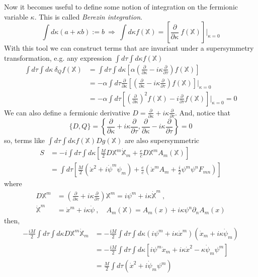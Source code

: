 \documentclass[a4paper,12pt]{article}
\numberwithin{equation}{section}
\numberwithin{exe}{section}
\newcommand{\X}{{\mathbb X}}
\newcommand{\p}{{\partial}}
\newcommand{\xd}{{\dot x}}
\renewcommand{\a}{{\alpha}}
\renewcommand{\d}{{\delta}}
\renewcommand{\k}{{\kappa}}
\begin{document}
Now it becomes useful to define some notion of integration on the fermionic variable $\k$. This is called {\it Berezin integration}.
	\begin{equation}
	\int d\k (a+\k b) := b\ \Rightarrow\ \int d\k f(\X) = \left[\frac{\p}{\p\k}\ f(\X)\right]|_{\k=0}
	\end{equation}
With this tool we can construct terms that are invariant under a supersymmetry transformation, e.g. any expression $\int d\tau \int d\k f(\X)$
	\begin{align}
	\int d\tau \int d\k\ \d_Q f(\X) & = \int d\tau \int d\k \left[\a\left(\frac{\p}{\p\k} - i\k\frac{\p}{\p\tau}\right)f(\X)\right] \nonumber \\
	& = -\a\int d\tau \frac{\p}{\p\k}\left[\left(\frac{\p}{\p\k} - i\k\frac{\p}{\p\tau}\right) f(\X)\right]|_{\k=0} \nonumber \\
	& = -\a\int d\tau \left[ \left(\frac{\p}{\p\k}\right)^2 f(\X) - i\frac{\p}{\p\tau}f(\X) \right]|_{\k=0} = 0
	\end{align}
We can also define a fermionic derivative $D=\frac{\p}{\p\k}+i\k\frac{\p}{\p\tau}$. And, notice that
	\begin{equation}
	\{D,Q\} = \left\{\frac{\p}{\p\k} + i\k\frac{\p}{\p\tau} ,\frac{\p}{\p\k} - i\k\frac{\p}{\p\tau} \right\} = 0
	\end{equation}
so, terms like $\int d\tau \int d\k f(\X) D g(\X)$ are also supersymmetric
	\begin{align}
	S & = -i\int d\tau \int d\k \left[ \frac{M}{2} D\X^m \dot\X_m + \frac{e}{c} D\X^m A_m(\X) \right] \nonumber \\
	& = \int d\tau \left[ \frac{M}{2} (\xd^2 + i\dot\psi^m \psi_m ) + \frac{e}{c} (\xd^m A_m + \frac{i}{2} \psi^m \psi^n F_{mn})   \right]
	\end{align}
where
	\begin{equation}
		\begin{aligned}
		D \X^m & = \left(\frac{\p}{\p\k} + i\k\frac{\p}{\p\tau}\right)\X^m = i\psi^m + i\k\dot\X^m\ , \\
		\dot\X^m & = \xd^m + i\k\dot\psi\ ,\quad A_m(\X) = A_m(x) + i\k\psi^n\p_n A_m(x)
		\end{aligned}
	\end{equation}
then,
	\begin{align}
	-\frac{i M}{2} \int d\tau\int d\k D\X^m\dot \X_m & = -\frac{i M}{2}\int d\tau\int d\k (i\psi^m + i\k\xd^m)(\xd_m + i\k\dot\psi_m) \nonumber \\
	& = -\frac{iM}{2} \int d\tau\int d\k \left[ i\psi^m \xd_m + i\k\xd^2 - \k\dot\psi_m \psi^m \right] \nonumber \\
	& = \frac{M}{2} \int d\tau (\xd^2 + i\dot\psi_m \psi^m)
	\end{align}
\end{document}

